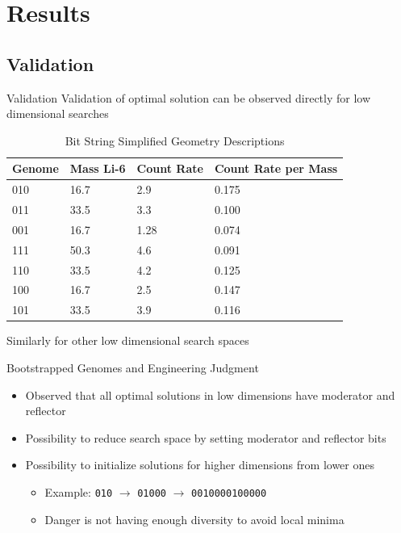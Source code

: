 \documentclass[compress]{beamer}
\begin{document}
\section{Results}
\subsection{Validation}
\begin{frame}{Validation}
Validation of optimal solution can be observed directly for low dimensional searches
\begin{table}
    \caption[3 Bit Genome Results]{Bit String Simplified Geometry Descriptions}
    \label{tab:BitStringGeo}
    \centering
    \tiny
    \begin{tabular}{ p{1.5cm} | p{1.5cm} p{1.5cm}  p{1.5cm}}
			Genome&Mass Li-6&Count Rate& Count Rate per Mass \\
      \hline
      \hline
			010&16.7&2.9&0.175 \\ 
			\hline
			011&33.5&3.3&0.100 \\
			001&16.7&1.28&0.074 \\
			111&50.3&4.6&0.091 \\
			110&33.5&4.2&0.125 \\ 
			100&16.7&2.5&0.147 \\
			101&33.5&3.9&0.116 \\
      \hline
    \end{tabular}
\end{table}
Similarly for other low dimensional search spaces
\end{frame}

\begin{frame}[fragile]{Bootstrapped Genomes and Engineering Judgment}
\begin{itemize}
	\item Observed that all optimal solutions in low dimensions have moderator and reflector
	\item Possibility to reduce search space by setting moderator and reflector bits
	\item Possibility to initialize solutions for higher dimensions from lower ones
	\begin{itemize}
		\item Example: \verb+010+ $\to$ \verb+01000+ $\to$ \verb+0010000100000+
		\item Danger is not having enough diversity to avoid local minima
	\end{itemize}
\end{itemize}
\end{frame}
\end{document}
